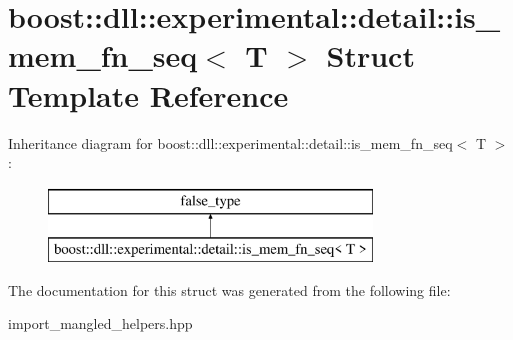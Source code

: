 \hypertarget{a01520}{}\section{boost\+:\+:dll\+:\+:experimental\+:\+:detail\+:\+:is\+\_\+mem\+\_\+fn\+\_\+seq$<$ T $>$ Struct Template Reference}
\label{a01520}
Inheritance diagram for boost\+:\+:dll\+:\+:experimental\+:\+:detail\+:\+:is\+\_\+mem\+\_\+fn\+\_\+seq$<$ T $>$\+:\begin{figure}[H]
\begin{center}
\leavevmode
\includegraphics[height=2.000000cm]{a01520}
\end{center}
\end{figure}


The documentation for this struct was generated from the following file\+:\begin{DoxyCompactItemize}
\item 
import\+\_\+mangled\+\_\+helpers.\+hpp\end{DoxyCompactItemize}
